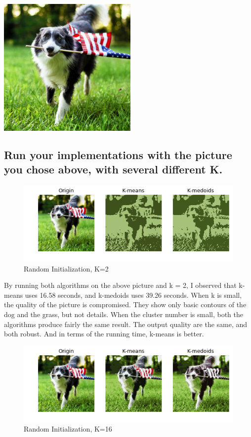 \documentclass{article}
\begin{document}
\begin{center}
\includegraphics[scale=0.5]{dog}
\label{fig:dog original}
\end{center}

\subsection{Run your implementations with the picture you chose above, with several different K.}
\medskip

\begin{figure}[h!]
\centering
  \caption{Random Initialization, K=2}
  \includegraphics[scale=0.6]{dog_k2}
\end{figure}

By running both algorithms on the above picture and k = 2, I observed that k-means uses 16.58 seconds, and k-medoids uses 39.26 seconds. When k is small, the quality of the picture is compromised. They show only basic contours of the dog and the grass, but not details. When the cluster number is small, both the algorithms produce fairly the same result. The output quality are the same, and both robust. And in terms of the running time, k-means is better.
\bigskip

\begin{figure}[h!]
\centering
  \caption{Random Initialization, K=16}
  \includegraphics[scale=0.6]{dog_k16}
\end{figure}
\end{document}
